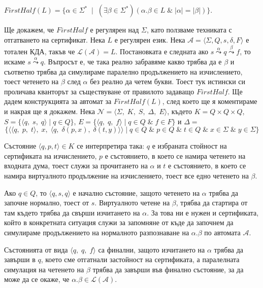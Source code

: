 \documentclass[12pt]{article}
\begin{document}
\(FirstHalf(L) = \{\alpha \in \Sigma^* \;\mid\; (\exists \beta \in \Sigma^*)(\alpha.\beta \in L \;\&\; |\alpha| = |\beta|)\}\).

Ще докажем, че \(FirstHalf\) е регулярен над \(\Sigma\), като ползваме техниката с отгатването на сертификат. Нека \(L\) е регулярен език. Нека \(\mathcal{A} = \langle \Sigma, Q, s, \delta, F \rangle\) е тотален КДА, такъв че \(\mathcal{L}(\mathcal{A}) = L\). Постановката е следната ако \(s \overset{\alpha}{\leadsto} q \overset{\beta}{\leadsto} f\), то искаме \(s \overset{\alpha}{\leadsto} q \).
Въпросът е, че така реално забравяме какво трябва да е \(\beta\) и съответно трябва да симулираме паралелно продължението на изчислението, тоест четенето на \(\beta\) след \(\alpha\) без реално да четем букви. Тоест тук истински си проличава кванторът за съществуване от правилото задаващо \(FirstHalf\). Ще дадем конструкцията за автомат за \(FirstHalf(L)\), след което ще я коментираме и накрая ще я докажем.
Нека  \(\mathcal{N} = \langle \Sigma,\; K,\; S,\; \Delta,\; E \rangle\), където
\(K = Q \times Q \times Q\), \(S = \{\langle q,\; s,\; q \rangle \mid q \in Q\}\),
\(E = \{\langle q,\; q,\; f \rangle \mid q \in Q \;\&\; f \in F\}\) и \(\Delta =\)
\[\{\langle \langle q,\; p,\; t \rangle,\; x,\; \langle q,\; \delta(p, x),\; \delta(t, y) \rangle \rangle \mid q \in Q \;\&\; p \in Q \;\&\; t \in Q \;\&\; x \in \Sigma \;\&\; y \in \Sigma\}\]

Състояние \(\langle q, p, t \rangle \in K\) се интерпретира така:
\(q\) е избраната стойност на сертификата на изчислението,
\(p\) е състоянието, в което се намира четенето на входната дума, тоест служи за прочитането на \(\alpha\)
и \(t\) е състоянието, в което се намира виртуалното продължение на изчислението, тоест все едно четенето на \(\beta\).

Ако \(q \in Q\), то \(\langle q, s, q \rangle\) е начално състояние, защото четенето на \(\alpha\) трябва да започне нормално, тоест от \(s\). Виртуалното четене на \(\beta\), трябва да стартира от там където трябва да свърши изчитането на \(\alpha\). За това ни е нужен и сертификата, който в конкретната ситуация служи за запомняне от къде да започнем да симулираме продължението на нормалното разпознаване на \(\alpha.\beta\) по автомата \(\mathcal A\).

Състоянията от вида \(\langle q,\; q,\; f \rangle \) са финални, защото изчитането на \(\alpha\) трябва да завърши в \(q\), което сме отгатнали застойност на сертификата, а паралелната симулация на четенето на \(\beta\) трябва да завърши във финално състояние, за да може да се окаже, че \(\alpha.\beta \in \mathcal{L}( \mathcal A)\).
\end{document}
